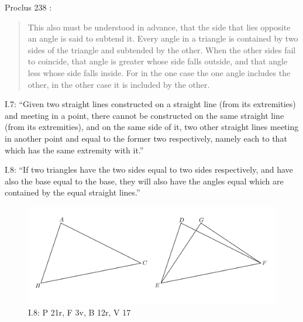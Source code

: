 \documentclass{article}
\begin{document}
Proclus 238 \cite[p.~186]{proclus}:

\begin{quote}
This also must  be understood in advance, that the side that
lies opposite an angle is said to subtend it. Every angle in a 
triangle is contained by two sides of the triangle and subtended by the other.
When the other 
sides fail to coincide, that angle is greater whose side falls
outside, and that angle less whose side falls inside. For in the
one case the one angle includes the other, in the other case it
is included by the other.
\end{quote}

I.7: ``Given two straight lines constructed on a straight line
(from its extremities) and meeting in a point, there cannot be
constructed on the same straight line (from its extremities),
and on the same side of it, two other straight lines meeting in
another point and equal to the former two respectively, namely
each to that which has the same extremity with it.''


I.8: ``If two triangles have the two sides equal to two sides
respectively, and have also the base equal to the base, they will
also have the angles equal which are contained by the equal
straight lines.''

\begin{figure}
\begin{center}
\includegraphics[scale=1]{I8.png}
\end{center}
\caption{I.8: P 21r, F 3v, B 12r, V 17}
\label{I8}
\end{figure}
\end{document}
